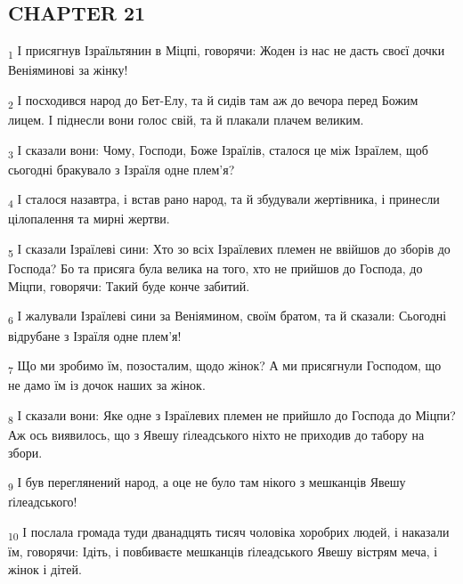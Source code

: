 \subsection{CHAPTER 21}
\begin{tcolorbox}
\textsubscript{1} І присягнув Ізраїльтянин в Міцпі, говорячи: Жоден із нас не дасть своєї дочки Веніяминові за жінку!
\end{tcolorbox}
\begin{tcolorbox}
\textsubscript{2} І посходився народ до Бет-Елу, та й сидів там аж до вечора перед Божим лицем. І піднесли вони голос свій, та й плакали плачем великим.
\end{tcolorbox}
\begin{tcolorbox}
\textsubscript{3} І сказали вони: Чому, Господи, Боже Ізраїлів, сталося це між Ізраїлем, щоб сьогодні бракувало з Ізраїля одне плем'я?
\end{tcolorbox}
\begin{tcolorbox}
\textsubscript{4} І сталося назавтра, і встав рано народ, та й збудували жертівника, і принесли цілопалення та мирні жертви.
\end{tcolorbox}
\begin{tcolorbox}
\textsubscript{5} І сказали Ізраїлеві сини: Хто зо всіх Ізраїлевих племен не ввійшов до зборів до Господа? Бо та присяга була велика на того, хто не прийшов до Господа, до Міцпи, говорячи: Такий буде конче забитий.
\end{tcolorbox}
\begin{tcolorbox}
\textsubscript{6} І жалували Ізраїлеві сини за Веніямином, своїм братом, та й сказали: Сьогодні відрубане з Ізраїля одне плем'я!
\end{tcolorbox}
\begin{tcolorbox}
\textsubscript{7} Що ми зробимо їм, позосталим, щодо жінок? А ми присягнули Господом, що не дамо їм із дочок наших за жінок.
\end{tcolorbox}
\begin{tcolorbox}
\textsubscript{8} І сказали вони: Яке одне з Ізраїлевих племен не прийшло до Господа до Міцпи? Аж ось виявилось, що з Явешу ґілеадського ніхто не приходив до табору на збори.
\end{tcolorbox}
\begin{tcolorbox}
\textsubscript{9} І був переглянений народ, а оце не було там нікого з мешканців Явешу ґілеадського!
\end{tcolorbox}
\begin{tcolorbox}
\textsubscript{10} І послала громада туди дванадцять тисяч чоловіка хоробрих людей, і наказали їм, говорячи: Ідіть, і повбиваєте мешканців ґілеадського Явешу вістрям меча, і жінок і дітей.
\end{tcolorbox}
